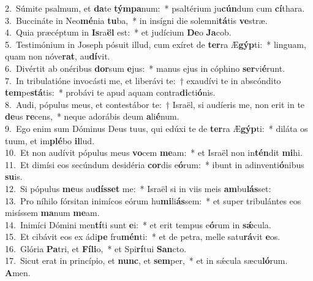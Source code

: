 {2.~}Súmite psalmum, et \textbf{da}te \textbf{tým}\textbf{pa}num:~* psaltérium ju\textbf{cún}dum cum \textbf{cí}thara.\\
{3.~}Buccináte in Neo\textbf{mé}nia \textbf{tu}ba,~* in insígni die solemni\textbf{tá}tis \textbf{ve}stræ.\\
{4.~}Quia præcéptum in \textbf{Is}ra\textbf{ël} est:~* et judícium \textbf{De}o \textbf{Ja}cob.\\
{5.~}Testimónium in Joseph pósuit illud, cum exíret de \textbf{ter}ra Æ\textbf{gýp}ti:~* linguam, quam non nóve\textbf{rat}, au\textbf{dí}vit.\\
{6.~}Divértit ab onéribus \textbf{dor}sum \textbf{e}jus:~* manus ejus in cóphino \textbf{ser}vi\textbf{é}runt.\\
{7.~}In tribulatióne invocásti me, et liberávi te:~† exaudívi te in abscóndito \textbf{tem}pe\textbf{stá}tis:~* probávi te apud aquam contra\textbf{di}cti\textbf{ó}nis.\\
{8.~}Audi, pópulus meus, et contestábor te:~† Israël, si audíeris me, non erit in te \textbf{de}us \textbf{re}cens,~* neque adorábis deum \textbf{a}li\textbf{é}num.\\
{9.~}Ego enim sum Dóminus Deus tuus, qui edúxi te de \textbf{ter}ra Æ\textbf{gýp}ti:~* diláta os tuum, et im\textbf{plé}bo \textbf{il}lud.\\
{10.~}Et non audívit pópulus meus \textbf{vo}cem \textbf{me}am:~* et Israël non in\textbf{tén}dit \textbf{mi}hi.\\
{11.~}Et dimísi eos secúndum desidéria \textbf{cor}dis e\textbf{ó}rum:~* ibunt in adinventi\textbf{ó}nibus \textbf{su}is.\\
{12.~}Si pópulus \textbf{me}us au\textbf{dís}\textbf{set} me:~* Israël si in viis meis \textbf{am}bu\textbf{lás}set:\\
{13.~}Pro níhilo fórsitan inimícos eórum hu\textbf{mi}li\textbf{ás}sem:~* et super tribulántes eos misíssem \textbf{ma}num \textbf{me}am.\\
{14.~}Inimíci Dómini men\textbf{tí}ti sunt \textbf{e}i:~* et erit tempus e\textbf{ó}rum in \textbf{sǽ}cula.\\
{15.~}Et cibávit eos ex ádi\textbf{pe} fru\textbf{mén}ti:~* et de petra, melle satu\textbf{rá}vit \textbf{e}os.\\
{16.~}Glória \textbf{Pa}tri, et \textbf{Fí}\textbf{li}o,~* et Spi\textbf{rí}tui \textbf{San}cto.\\
{17.~}Sicut erat in princípio, et \textbf{nunc}, et \textbf{sem}per,~* et in sǽcula sæcu\textbf{ló}rum. \textbf{A}men.\\
